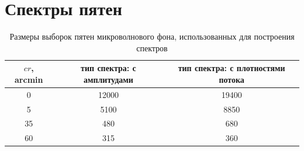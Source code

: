 \documentclass[12pt,a4paper]{article}
\begin{document}
\newpage
\section{Спектры пятен}

\begin{table}[h!]
	\setcaptionmargin{0mm}
	\caption{Размеры выборок пятен микроволнового фона, использованных для построения спектров}
	\label{tab:nums_spectr}
	\medskip
	\begin{tabular}{c|c|c}
		$cr$, arcmin & тип спектра: с амплитудами & тип спектра: с плотностями потока \\[3 pt] \hline
		0 & 12000 & 19400 \\[3 pt]
		5 & 5100 & 8850 \\[3 pt]
		35 & 480 & 680 \\[3 pt]
		60 & 315 & 360 \\[3 pt]
	\end{tabular}
\end{table}
\end{document}
